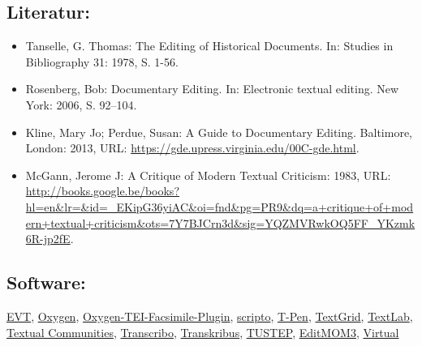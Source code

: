 \documentclass{article}
\begin{document}
        \subsection*{Literatur:}\begin{itemize}\item Tanselle, G. Thomas: The Editing of Historical Documents. In: Studies in Bibliography 31: 1978, S. 1-56.\item Rosenberg, Bob: Documentary Editing. In: Electronic textual editing. New York: 2006, S. 92–104.\item Kline, Mary Jo; Perdue, Susan: A Guide to Documentary Editing. Baltimore, London: 2013, URL: \url{https://gde.upress.virginia.edu/00C-gde.html}.\item McGann, Jerome J: A Critique of Modern Textual Criticism: 1983, URL: \url{http://books.google.be/books?hl=en&lr=&id=_EKipG36yiAC&oi=fnd&pg=PR9&dq=a+critique+of+modern+textual+criticism&ots=7Y7BJCrn3d&sig=YQZMVRwkOQ5FF_YKzmk6R-jp2fE}.\end{itemize}\subsection*{Software:}\href{http://evt.labcd.unipi.it/}{EVT}, \href{http://oxygenxml.com/}{Oxygen}, \href{https://github.com/oxygenxml/TEI-Facsimile-Plugin}{Oxygen-TEI-Facsimile-Plugin}, \href{http://scripto.org/}{scripto}, \href{http://t-pen.org/TPEN/}{T-Pen}, \href{https://textgrid.de/}{TextGrid}, \href{https://www.textlab.org/about/}{TextLab}, \href{https://textualcommunities.org/app/}{Textual
                           Communities}, \href{http://transcribo.org/en/}{Transcribo}, \href{https://transkribus.eu/Transkribus/}{Transkribus}, \href{http://www.tustep.uni-tuebingen.de/}{TUSTEP}, \href{https://docs.google.com/document/d/1QsFodbmuOld4ZAmnURR2tKewE1tgRo1cGxpaIUy92Mw/edit}{EditMOM3}, \href{http://wlt.synat.pcss.pl/}{Virtual
}
\end{document}
